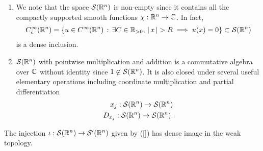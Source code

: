 \documentclass[12pt]{article}
\begin{document}
\begin{rem}
    \begin{enumerate}
        \item     We note that the space $\mathcal{S}({\mathbb R}^n)$ is non-empty since it contains all the compactly supported smooth functions $\chi : {\mathbb R}^n \to {\ensuremath {\mathbb C}}$. In fact, 
        \begin{align*}
        C^\infty_c({\mathbb R}^n) = \left\{u \in C^\infty({\mathbb R}^n) \, : \, \exists C \in {\ensuremath {\mathbb R}}_{> 0}, \, \left|\, x\,\right| > R \implies u(x) = 0\right\} \subset \mathcal{S}({\mathbb R}^n)
        \end{align*}
        is a dense inclusion. 
        
        \item $\mathcal{S}({\mathbb R}^n)$ with pointwise multiplication and addition is a commutative algebra over ${\mathbb C}$ without identity since $1 \not\in \mathcal{S}({\mathbb R}^n)$. It is also closed under several useful elementary operations including coordinate multiplication and partial differentiation
        \begin{align*}
        x_j : \mathcal{S}({\mathbb R}^n) \to \mathcal{S}({\mathbb R}^n) \\
        D_{x_j} : \mathcal{S}({\mathbb R}^n) \to \mathcal{S}({\mathbb R}^n). 
        \end{align*}
        
    \end{enumerate}
\end{rem}

\begin{fdefinition}
    
\end{fdefinition}
    
\begin{flemma}
    The injection $\iota : \mathcal{S}({\mathbb R}^n) \to \mathcal{S}'({\mathbb R}^n)$ given by (\ref{}) has dense image in the weak topology. 
\end{flemma}    


\begin{flemma}
    
\end{flemma}

\begin{ftheorem}
    
\end{ftheorem}
\end{document}
